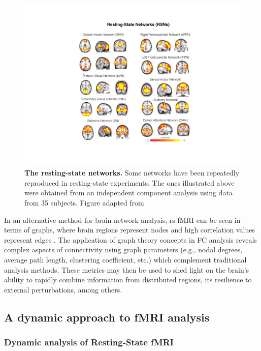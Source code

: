 \begin{figure}[h!]
\centering\includegraphics[width=0.9\linewidth]{images/Ch2/Ch2_RSN.pdf}
\caption{\textbf{The resting-state networks.} Some networks have been repeatedly reproduced in resting-state experiments. The ones illustrated above were obtained from an independent component analysis using data from 35 subjects. Figure adapted from \citet{Akbar2016}  } \label{fig:RSN}
\end{figure}





In an alternative method for brain network analysis, rs-fMRI can be seen in terms of graphs, where brain regions represent nodes and high correlation values represent edges \citep{Rubinov2010, Farahani2019}. The application of graph theory concepts in FC analysis reveals complex aspects of connectivity using graph parameters (e.g., nodal degrees, average path length, clustering coefficient, etc.) which complement traditional analysis methods. These metrics may then be used to shed light on the brain's ability to rapidly combine information from distributed regions, its resilience to external perturbations, among others.

\subsection{A dynamic approach to fMRI analysis}

\subsubsection{Dynamic analysis of Resting-State fMRI}


